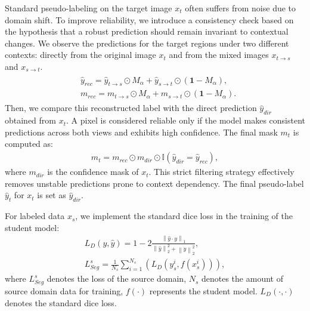 Standard pseudo-labeling on the target image $x_{t}$ often suffers from noise due to domain shift. To improve reliability, we introduce a consistency check based on the hypothesis that a robust prediction should remain invariant to contextual changes. We observe the predictions for the target regions under two different contexts: directly from the original image $x_{t}$ and from the mixed images $x_{t\to s}$ and $x_{s\to t}$. 
\begin{align} \label{eq6}
    \begin{split} 
      & \hat{y}_{rec} = \hat{y}_{t\to s} \odot \mathit{M}_{\alpha} + \hat{y}_{s\to t} \odot (\mathbf{1} - \mathit{M}_{\alpha}), \\
      & m_{rec} = m_{t\to s} \odot \mathit{M}_{\alpha} + m_{s\to t} \odot (\mathbf{1} - \mathit{M}_{\alpha}).
    \end{split} 
\end{align}
Then, we compare this reconstructed label with the direct prediction $\hat{y}_{dir}$ obtained from $x_{t}$. A pixel is considered reliable only if the model makes consistent predictions across both views and exhibits high confidence. The final mask $m_{t}$ is computed as:
\begin{align} \label{eq_consistency}
      m_{t} = m_{rec} \odot m_{dir} \odot \mathbb{I}(\hat{y}_{dir} = \hat{y}_{rec}),
\end{align}
where $m_{dir}$ is the confidence mask of $x_{t}$. This strict filtering strategy effectively removes unstable predictions prone to context dependency. The final pseudo-label $\hat{y}_{t}$ for $x_{t}$ is set as $\hat{y}_{dir}$.

For labeled data $x_{s}$, we implement the standard dice loss in the training of the student model:
\begin{align} \label{eq7}
    L_{D}(y, \hat{y}) = 1 - 2 \frac{\left \| \hat{y} \cdot y  \right \|_{1}}{\left \| \hat{y}  \right \|_{2}^{2} + \left \| y  \right \|_{2}^{2} }, \\
    L_{Seg}^{s} = \frac{1}{N_{s}} \sum_{i=1}^{N_{s}}(L_{D}(y_{s}^{i}, f(x_{s}^{i}))), 
\end{align}
where $ L_{Seg}^{s}$ denotes the loss of the source domain, $N_{s}$ denotes the amount of source domain data for training, $f(\cdot)$ represents the student model. $L_{D}(\cdot, \cdot)$ denotes the standard dice loss.

